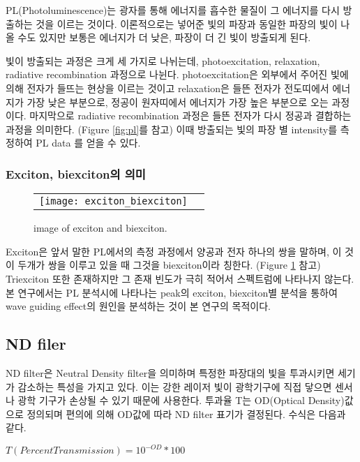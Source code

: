 PL(Photoluminescence)는 광자를 통해 에너지를 흡수한 물질이 그 에너지를 다시 방출하는 것을 이르는 것이다. 이론적으로는 넣어준 빛의 파장과 동일한 파장의 빛이 나올 수도 있지만 보통은 에너지가 더 낮은, 파장이 더 긴 빛이 방출되게 된다. 

빛이 방출되는 과정은 크게 세 가지로 나뉘는데, photoexcitation, relaxation, radiative recombination 과정으로 나뉜다. photoexcitation은 외부에서 주어진 빛에 의해 전자가 들뜨는 현상을 이르는 것이고 relaxation은 들뜬 전자가 전도띠에서 에너지가 가장 낮은 부분으로, 정공이 원자띠에서 에너지가 가장 높은 부분으로 오는 과정이다. 마지막으로 radiative recombination 과정은 들뜬 전자가 다시 정공과 결합하는 과정을 의미한다. (Figure \ref{fig:pl}를 참고) 이때 방출되는 빛의 파장 별 intensity를 측정하여 PL data 를 얻을 수 있다.

\subsubsection{Exciton, biexciton의 의미}
\begin{figure}[H]
	\begin{center}
		\begin{tabular}{cc}
			\texttt{[image: exciton\_biexciton]}
		\end{tabular}
	\end{center}
	\caption{image of exciton and biexciton.}
	\label{fig:ex}  
\end{figure}
Exciton은 앞서 말한 PL에서의 측정 과정에서 양공과 전자 하나의 쌍을 말하며, 이 것이 두개가 쌍을 이루고 있을 때 그것을 biexciton이라 칭한다. (Figure \ref{fig:ex} 참고) Triexciton 또한 존재하지만 그 존재 빈도가 극히 적어서 스펙트럼에 나타나지 않는다. 본 연구에서는 PL 분석시에 나타나는 peak의 exciton, biexciton별 분석을 통하여 wave guiding effect의 원인을 분석하는 것이 본 연구의 목적이다.

\subsection{ND filer}
ND filter은 Neutral Density filter을 의미하며 특정한 파장대의 빛을 투과시키면 세기가 감소하는 특성을 가지고 있다. 이는 강한 레이저 빛이 광학기구에 직접 닿으면 센서나 광학 기구가 손상될 수 있기 때문에 사용한다. 투과율 T는 OD(Optical Density)값으로 정의되며
편의에 의해 OD값에 따라 ND filter 표기가 결정된다. 수식은 다음과 같다.

$T(Percent Transmission) = 10^{-OD}*100$

